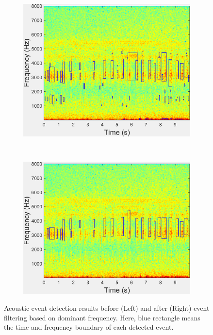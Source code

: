 \begin{figure}[htb!]
\centering

        \begin{subfigure}[b]{0.45\textwidth}
                \includegraphics[width=\textwidth]{image/Ch6/AEoriginal.png}
        \end{subfigure}
       ~
              \begin{subfigure}[b]{0.45\textwidth}
                \includegraphics[width=\textwidth]{image/Ch6/AEfinal.png}
                
        \end{subfigure}  
     
\caption{Acoustic event detection results before (Left) and after (Right) event filtering based on dominant frequency. Here, blue rectangle means the time and frequency boundary of each detected event.}
        \label{fig:feature}
\end{figure}


